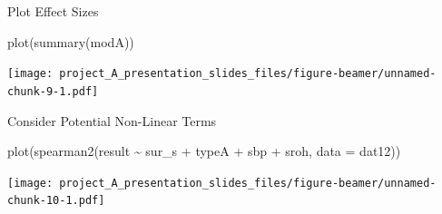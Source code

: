 \documentclass[
  ignorenonframetext,
]{beamer}
\newenvironment{Shaded}{\begin{snugshade}}{\end{snugshade}}
\newcommand{\AttributeTok}[1]{\textcolor[rgb]{0.77,0.63,0.00}{#1}}
\newcommand{\FunctionTok}[1]{\textcolor[rgb]{0.00,0.00,0.00}{#1}}
\newcommand{\NormalTok}[1]{#1}
\newcommand{\SpecialCharTok}[1]{\textcolor[rgb]{0.00,0.00,0.00}{#1}}
\begin{document}
\begin{frame}[fragile]{Plot Effect Sizes}
\protect\hypertarget{plot-effect-sizes}{}
\begin{Shaded}
\begin{Highlighting}[]
\FunctionTok{plot}\NormalTok{(}\FunctionTok{summary}\NormalTok{(modA))}
\end{Highlighting}
\end{Shaded}

\texttt{[image: project\_A\_presentation\_slides\_files/figure-beamer/unnamed-chunk-9-1.pdf]}
\end{frame}

\begin{frame}[fragile]{Consider Potential Non-Linear Terms}
\protect\hypertarget{consider-potential-non-linear-terms}{}
\begin{Shaded}
\begin{Highlighting}[]
\FunctionTok{plot}\NormalTok{(}\FunctionTok{spearman2}\NormalTok{(result }\SpecialCharTok{\textasciitilde{}}\NormalTok{ sur\_s }\SpecialCharTok{+}\NormalTok{ typeA }\SpecialCharTok{+}\NormalTok{ sbp }\SpecialCharTok{+}\NormalTok{ sroh, }
               \AttributeTok{data =}\NormalTok{ dat12))}
\end{Highlighting}
\end{Shaded}

\texttt{[image: project\_A\_presentation\_slides\_files/figure-beamer/unnamed-chunk-10-1.pdf]}
\end{frame}
\end{document}
